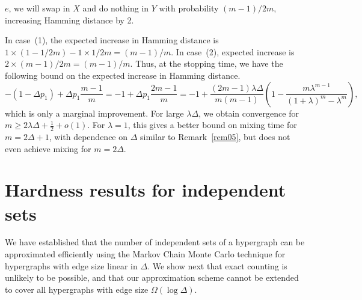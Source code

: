 \documentclass[11pt]{article}
\theoremstyle{definition}
\theoremstyle{remark}
\begin{document}
{\begin{enumerate}
    $e$, we will swap in $X$ and do nothing in $Y$ with probability $(m-1)/2m$,
    increasing Hamming distance by 2.
\end{enumerate}
In case~(1), the expected increase in Hamming distance is
$1\times(1-1/2m)-1\times 1/2m = (m-1)/m$. In case~(2), expected increase is
$2\times(m-1)/2m = (m-1)/m$. Thus, at the stopping time, we have the
following bound on the expected increase in Hamming distance.%
\[-(1-\Delta p_1)+\Delta p_1 \frac{m-1}{m} = -1 + \Delta p_1
\frac{2m-1}{m} = -1 +
\frac{(2m-1)\lambda\Delta}{m(m-1)}\left(1-\frac{m\lambda^{m-1}}
{(1+\lambda)^m-\lambda^m}\right),\]%
which is only a marginal improvement. For large $\lambda\Delta$, we obtain
convergence for $m \geq 2\lambda\Delta+\tfrac{1}{2}+o(1)$. For $\lambda=1$,
this gives a better bound on mixing time for $m=2\Delta+1$, with dependence
on $\Delta$ similar to Remark~\ref{rem05}, but does not even achieve mixing
for $m=2\Delta$.%
}
\section{Hardness results for independent sets}\label{sec:hard}
We have established that  the number of independent sets of a hypergraph
can be approximated efficiently using the Markov Chain Monte Carlo
technique for hypergraphs with edge size linear in $\Delta$. We show next
that exact counting is unlikely to be possible, and that our approximation
scheme cannot be extended to cover all hypergraphs with edge size
$\Omega(\log\Delta)$.
\end{document}
